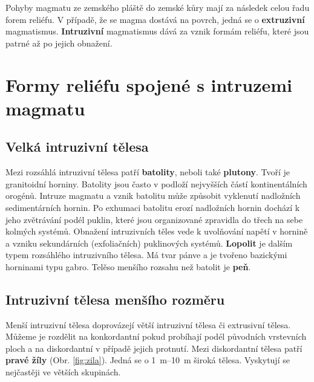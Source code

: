 Pohyby magmatu ze zemského pláště do zemské kůry mají za následek celou řadu forem reliéfu. V případě, že se magma dostává na povrch, jedná se o \textbf{extruzivní} magmatismus.  \textbf{Intruzivní} magmatismus dává za vznik formám reliéfu, které jsou patrné až po jejich obnažení.

\section{Formy reliéfu spojené s intruzemi magmatu}
\subsection{Velká intruzivní tělesa}
Mezi rozsáhlá intruzivní tělesa patří \textbf{batolity}, neboli také \textbf{plutony}. Tvoří je granitoidní horniny. Batolity jsou často v podloží nejvyšších částí kontinentálních orogénů. Intruze magmatu a vznik batolitu může způsobit vyklenutí nadložních sedimentárních hornin. Po exhumaci batolitu erozí nadložních hornin dochází k jeho zvětrávání podél puklin, které jsou organizované zpravidla do třech na sebe kolmých systémů. Obnažení intruzivních těles vede k uvolňování napětí v hornině a vzniku sekundárních (exfoliačních) puklinových systémů. \textbf{Lopolit} je dalším typem rozsáhlého intruzivního tělesa. Má tvar pánve a je tvořeno bazickými horninami typu gabro. Telěso menšího rozsahu než batolit je \textbf{peň}.

\subsection{Intruzivní tělesa menšího rozměru}
Menší intruzivní tělesa doprovázejí větší intruzivní tělesa či extrusivní tělesa. Můžeme je rozdělit na konkordantní pokud probíhají podél původních vrstevních ploch a na diskordantní v případě jejich protnutí. Mezi diskordantní tělesa patří \textbf{pravé žíly} (Obr. \ref{fig:zila}). Jedná se o \SIrange{1}{10}{\metre} široká tělesa. Vyskytují se nejčastěji ve větších skupinách.

